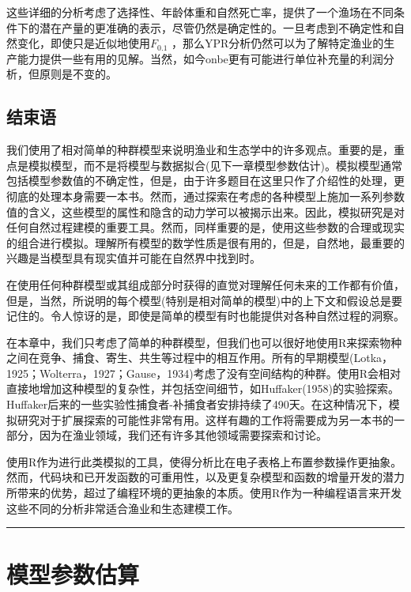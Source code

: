 \documentclass[
  lang=cn,
  11pt,
  scheme=chinese,
  chinesefont=nofont,
  citestyle=gb7714-2015,
  bibstyle=gb7714-2015]{elegantbook}
\begin{document}
这些详细的分析考虑了选择性、年龄体重和自然死亡率，提供了一个渔场在不同条件下的潜在产量的更准确的表示，尽管仍然是确定性的。一旦考虑到不确定性和自然变化，即使只是近似地使用\(F_{0.1}\) ，那么YPR分析仍然可以为了解特定渔业的生产能力提供一些有用的见解。当然，如今onbe更有可能进行单位补充量的利润分析，但原则是不变的。

\section{结束语}\label{ux7ed3ux675fux8bed-1}

我们使用了相对简单的种群模型来说明渔业和生态学中的许多观点。重要的是，重点是模拟模型，而不是将模型与数据拟合(见下一章模型参数估计)。模拟模型通常包括模型参数值的不确定性，但是，由于许多题目在这里只作了介绍性的处理，更彻底的处理本身需要一本书。然而，通过探索在考虑的各种模型上施加一系列参数值的含义，这些模型的属性和隐含的动力学可以被揭示出来。因此，模拟研究是对任何自然过程建模的重要工具。然而，同样重要的是，使用这些参数的合理或现实的组合进行模拟。理解所有模型的数学性质是很有用的，但是，自然地，最重要的兴趣是当模型具有现实值并可能在自然界中找到时。

在使用任何种群模型或其组成部分时获得的直觉对理解任何未来的工作都有价值，但是，当然，所说明的每个模型(特别是相对简单的模型)中的上下文和假设总是要记住的。令人惊讶的是，即使是简单的模型有时也能提供对各种自然过程的洞察。

在本章中，我们只考虑了简单的种群模型，但我们也可以很好地使用R来探索物种之间在竞争、捕食、寄生、共生等过程中的相互作用。所有的早期模型(Lotka，1925；Wolterra，1927；Gause，1934)考虑了没有空间结构的种群。使用R会相对直接地增加这种模型的复杂性，并包括空间细节，如Huffaker(1958)的实验探索。Huffaker后来的一些实验性捕食者-补捕食者安排持续了490天。在这种情况下，模拟研究对于扩展探索的可能性非常有用。这样有趣的工作将需要成为另一本书的一部分，因为在渔业领域，我们还有许多其他领域需要探索和讨论。

使用R作为进行此类模拟的工具，使得分析比在电子表格上布置参数操作更抽象。然而，代码块和已开发函数的可重用性，以及更复杂模型和函数的增量开发的潜力所带来的优势，超过了编程环境的更抽象的本质。使用R作为一种编程语言来开发这些不同的分析非常适合渔业和生态建模工作。

\begin{center}\rule{0.5\linewidth}{0.5pt}\end{center}

\chapter{模型参数估算}\label{ux6a21ux578bux53c2ux6570ux4f30ux7b97}
\end{document}
